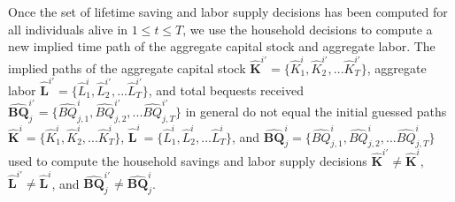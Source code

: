 \documentclass[letterpaper,12pt]{article}
\theoremstyle{definition}
\begin{document}
  Once the set of lifetime saving and labor supply decisions has been computed for all individuals alive in $1\leq t\leq T$, we use the household decisions to compute a new implied time path of the aggregate capital stock and aggregate labor. The implied paths of the aggregate capital stock $\bm{\hat{K}}^{i'}=\{\hat{K}_1^i,\hat{K}_2^{i'},...\hat{K}_T^{i'}\}$, aggregate labor $\bm{\hat{L}}^{i'}=\{\hat{L}_1^i,\hat{L}_2^{i'},...\hat{L}_T^{i'}\}$, and total bequests received $\bm{\hat{BQ}}_j^{i'}=\{\hat{BQ}_{j,1}^i,\hat{BQ}_{j,2}^{i'},...\hat{BQ}_{j,T}^{i'}\}$ in general do not equal the initial guessed paths $\bm{\hat{K}}^{i}=\{\hat{K}_1^i,\hat{K}_2^{i},...\hat{K}_T^{i}\}$, $\bm{\hat{L}}^{i}=\{\hat{L}_1^i,\hat{L}_2^{i},...\hat{L}_T^{i}\}$, and $\bm{\hat{BQ}}_j^{i}=\{\hat{BQ}_{j,1}^i,\hat{BQ}_{j,2}^{i},...\hat{BQ}_{j,T}^{i}\}$ used to compute the household savings and labor supply decisions $\bm{\hat{K}}^{i'}\neq\bm{\hat{K}}^i$, $\bm{\hat{L}}^{i'}\neq\bm{\hat{L}}^i$, and $\bm{\hat{BQ}}_j^{i'}\neq\bm{\hat{BQ}}_j^i$.
\end{document}
